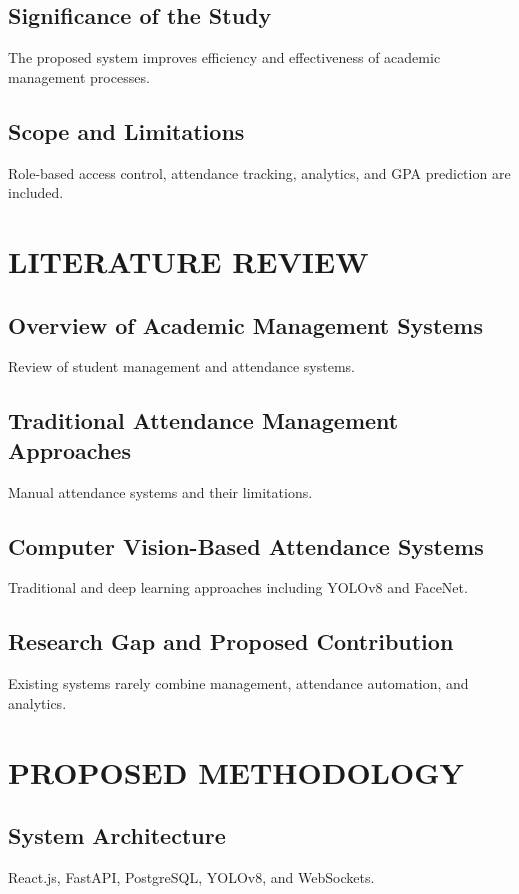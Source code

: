 \documentclass[12pt,a4paper]{report}
\begin{document}
\section{Significance of the Study}
The proposed system improves efficiency and effectiveness of academic management processes.

\section{Scope and Limitations}
Role-based access control, attendance tracking, analytics, and GPA prediction are included.

\clearpage
\chapter{LITERATURE REVIEW}

\section{Overview of Academic Management Systems}
Review of student management and attendance systems.

\section{Traditional Attendance Management Approaches}
Manual attendance systems and their limitations.

\section{Computer Vision-Based Attendance Systems}
Traditional and deep learning approaches including YOLOv8 and FaceNet.

\section{Research Gap and Proposed Contribution}
Existing systems rarely combine management, attendance automation, and analytics.

\clearpage
\chapter{PROPOSED METHODOLOGY}

\section{System Architecture}
React.js, FastAPI, PostgreSQL, YOLOv8, and WebSockets.
\end{document}
